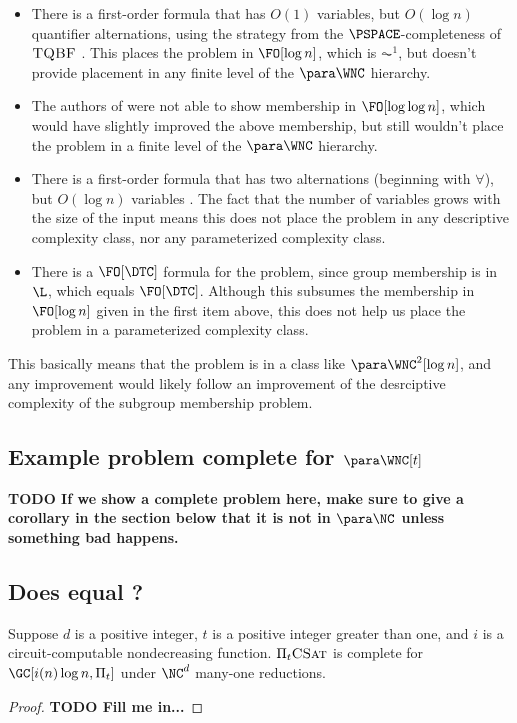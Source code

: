 \documentclass{article}
\newcommand{\todo}[1]{\textbf{TODO #1}}
\newcommand{\PiCSAT}{\Pi_t \textsc{CSat}}
\begin{document}
\begin{itemize}
\item
  There is a first-order formula that has $O(1)$ variables, but $O(\log n)$ quantifier alternations, using the strategy from the $\PSPACE$-completeness of $\textsc{TQBF}$ \autocite[Lemma~2.3]{nt16}.
  This places the problem in $\FO[\log n]$, which is $\AC^1$, but doesn't provide placement in any finite level of the $\para \WNC$ hierarchy.
\item
  The authors of \autocite{bklm01} were not able to show membership in $\FO[\log \log n]$, which would have slightly improved the above membership, but still wouldn't place the problem in a finite level of the $\para \WNC$ hierarchy.
\item
  There is a first-order formula that has two alternations (beginning with $\forall$), but $O(\log n)$ variables \autocite[Lemma~3.5]{nt16}.
  The fact that the number of variables grows with the size of the input means this does not place the problem in any descriptive complexity class, nor any parameterized complexity class.
\item
  There is a $\FO[\DTC]$ formula for the problem, since group membership is in $\L$, which equals $\FO[\DTC]$.
  Although this subsumes the membership in $\FO[\log n]$ given in the first item above, this does not help us place the problem in a parameterized complexity class.
\end{itemize}
This basically means that the problem is in a class like $\para \WNC^2[\log n]$, and any improvement would likely follow an improvement of the desrciptive complexity of the subgroup membership problem.

\subsection{Example problem complete for \texorpdfstring{$\para \WNC[t]$}{paraWNC[t]}}

\todo{If we show a complete problem here, make sure to give a corollary in the section below that it is not in $\para \NC$ unless something bad happens.}

\subsection{Does \texorpdfstring{\para \NC}{paraNC} equal \texorpdfstring{\para \WNC[t]}{paraWNC[t]}?}

\begin{theorem}\label{thm:picsatgc}
  Suppose $d$ is a positive integer, $t$ is a positive integer greater than one, and $i$ is a circuit-computable nondecreasing function.
  $\PiCSAT$ is complete for $\GC[i(n) \log n, \Pi_t]$ under $\NC^d$ many-one reductions.
\end{theorem}
\begin{proof}
  \todo{Fill me in...}
\end{proof}
\end{document}
